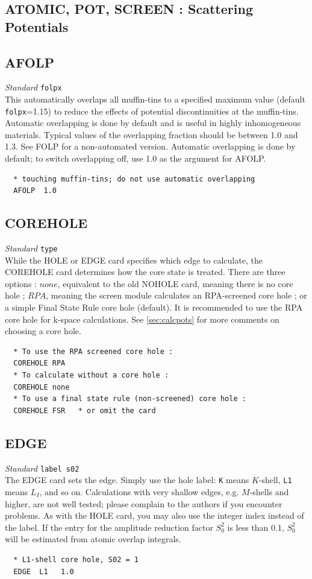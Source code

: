 \documentclass[11pt,oneside]{report} %
\renewcommand{\htmlref}[2]{\hyperlink{#2}{#1}}
\newenvironment{Card}[4]%
      {\vspace{3ex}%
        \subsection{#1}
        \quad\textsl{#3}\newline
        \quad\texttt{#2}\newline%
        \label{card:#4}\\}
      {}
\renewcommand{\htmlref}[2]{{#1}} %
\begin{document}
\subsection{ATOMIC, POT, SCREEN : Scattering Potentials}
\label{sec:Scatt-potent-modul}


\begin{Card}{AFOLP}{folpx}{Standard}{afo}
  This automatically overlaps all muffin-tins to a specified
  maximum value (default \texttt{folpx}=1.15) to reduce the effects of
  potential discontinuities at the muffin-tins. Automatic overlapping
  is done by default and is useful in highly inhomogeneous materials.
  Typical values of the overlapping fraction should be between 1.0 and
  1.3. See \htmlref{FOLP}{card:fol} for a non-automated version. 
  Automatic overlapping is done by default; to switch overlapping off, 
  use 1.0 as the argument for AFOLP.
\begin{verbatim}
  * touching muffin-tins; do not use automatic overlapping
  AFOLP  1.0
\end{verbatim}
\end{Card}



\begin{Card}{COREHOLE}{type}{Standard}{chl}
  While the HOLE or EDGE card specifies which edge to calculate, the COREHOLE card determines
  how the core state is treated.  There are three options : $none$, equivalent to the old NOHOLE card, meaning there is no core hole ; $RPA$, meaning the screen module calculates an RPA-screened core hole ; or a simple Final State Rule core hole (default).  It is recommended to use the RPA core hole for k-space calculations.  See \ref{sec:calcpots} for more comments on choosing a core hole.
  
\begin{verbatim}
  * To use the RPA screened core hole :
  COREHOLE RPA
  * To calculate without a core hole :
  COREHOLE none 
  * To use a final state rule (non-screened) core hole :
  COREHOLE FSR   * or omit the card
\end{verbatim}
\end{Card}



\begin{Card}{EDGE}{label s02}{Standard}{edg}
  The EDGE card sets the edge.  Simply use the hole label:
  \texttt{K} means $K$-shell, \texttt{L1} means $L_{I}$, and so on.  
  Calculations with very shallow 
  edges, e.g. $M$-shells and higher, are not well tested; please complain 
  to the authors if you encounter problems. As with the HOLE card, you may 
  also use the integer index instead of the label. If the
  entry for the amplitude reduction factor $S_0^2$ is less than 0.1, $S_0^2$ 
  will be estimated from atomic overlap integrals.

\begin{verbatim}
  * L1-shell core hole, S02 = 1
  EDGE  L1   1.0
\end{verbatim}
\end{Card}
\end{document}
